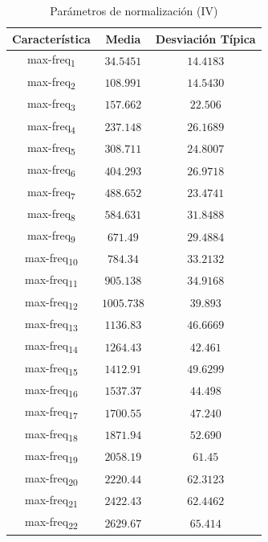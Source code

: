 \documentclass[12pt]{article}
\begin{document}
\begin{table}
	\caption{Parámetros de normalización (IV)}
	\centering
		\begin{tabular}{||c c c||}
			\hline
			Característica & Media & Desviación Típica  \\ [0.5ex]
			\hline\hline
			max-freq\textsubscript{1} & $34.5451$ & $14.4183$ \\
			\hline
			max-freq\textsubscript{2} & $108.991$ & $14.5430$ \\
			\hline
			max-freq\textsubscript{3} & $157.662$ & $22.506$ \\
			\hline
			max-freq\textsubscript{4} & $237.148$ & $26.1689$ \\
			\hline
			max-freq\textsubscript{5} & $308.711$ & $24.8007$ \\
			\hline
			max-freq\textsubscript{6} & $404.293$ & $26.9718$ \\
			\hline
			max-freq\textsubscript{7} & $488.652$ & $23.4741$ \\
			\hline
			max-freq\textsubscript{8} & $584.631$ & $31.8488$ \\
			\hline
			max-freq\textsubscript{9} & $671.49$ & $29.4884$ \\
			\hline
			max-freq\textsubscript{10} & $784.34$ & $33.2132$ \\
			\hline
			max-freq\textsubscript{11} & $905.138$ & $34.9168$ \\
			\hline
			max-freq\textsubscript{12} & $1005.738$ & $39.893$ \\
			\hline
			max-freq\textsubscript{13} & $1136.83$ & $46.6669$ \\
			\hline
			max-freq\textsubscript{14} & $1264.43$ & $42.461$ \\
			\hline
			max-freq\textsubscript{15} & $1412.91$ & $49.6299$ \\
			\hline
			max-freq\textsubscript{16} & $1537.37$ & $44.498$ \\
			\hline
			max-freq\textsubscript{17} & $1700.55$ & $47.240$ \\
			\hline
			max-freq\textsubscript{18} & $1871.94$ & $52.690$ \\
			\hline
			max-freq\textsubscript{19} & $2058.19$ & $61.45$ \\
			\hline
			max-freq\textsubscript{20} & $2220.44$ & $62.3123$ \\
			\hline
			max-freq\textsubscript{21} & $2422.43$ & $62.4462$ \\
			\hline
			max-freq\textsubscript{22} & $2629.67$ & $65.414$ \\

\end{tabular}
\end{table}
\end{document}
